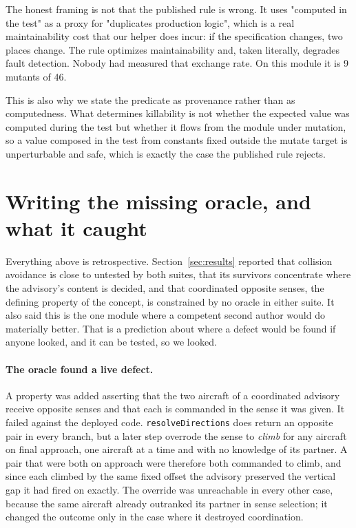 \documentclass[12pt]{article}
\begin{document}
The honest framing is not that the published rule is wrong. It uses "computed in
the test" as a proxy for "duplicates production logic", which is a real
maintainability cost that our helper does incur: if the specification changes,
two places change. The rule optimizes maintainability and, taken literally,
degrades fault detection. Nobody had measured that exchange rate. On this module
it is 9 mutants of 46.

This is also why we state the predicate as provenance rather than as computedness.
What determines killability is not whether the expected value was computed during
the test but whether it flows from the module under mutation, so a value composed in
the test from constants fixed outside the mutate target is unperturbable and safe,
which is exactly the case the published rule rejects.

\section{Writing the missing oracle, and what it caught}
\label{sec:prospective}

Everything above is retrospective. Section~\ref{sec:results} reported that
collision avoidance is close to untested by both suites, that its survivors
concentrate where the advisory's content is decided, and that coordinated
opposite senses, the defining property of the concept, is constrained by no
oracle in either suite. It also said this is the one module where a competent
second author would do materially better. That is a prediction about where a
defect would be found if anyone looked, and it can be tested, so we looked.

\paragraph{The oracle found a live defect.} A property was added asserting that
the two aircraft of a coordinated advisory receive opposite senses and that each
is commanded in the sense it was given. It failed against the deployed code.
\texttt{resolveDirections} does return an opposite pair in every branch, but a
later step overrode the sense to \emph{climb} for any aircraft on final approach,
one aircraft at a time and with no knowledge of its partner. A pair that were
both on approach were therefore both commanded to climb, and since each climbed
by the same fixed offset the advisory preserved the vertical gap it had fired on
exactly. The override was unreachable in every other case, because the same
aircraft already outranked its partner in sense selection; it changed the outcome
only in the case where it destroyed coordination.
\end{document}
